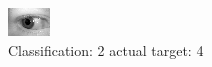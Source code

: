 \begin{figure}[h!]
\begin{center}
\includegraphics[width=0.60\columnwidth]{figures/ID844_class_2_target_4.png}
\end{center}
\caption{ Classification: 2 actual target: 4}
\label{fig:ID844_class_2_target_4}
\end{figure}
